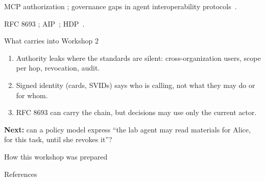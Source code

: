 \documentclass[aspectratio=169, 10pt]{beamer}
\begin{document}
{MCP authorization ; governance gaps in agent interoperability protocols \,\pre. }

{RFC 8693 ; AIP \,\pre; HDP \,\pre. }

\begin{frame}{What carries into Workshop 2}
  \begin{enumerate}
    \item Authority leaks where the standards are silent: cross-organization users, scope per hop, revocation, audit.
    \item Signed identity (cards, SVIDs) says who is calling, not what they may do or for whom.
    \item RFC 8693 can carry the chain, but decisions may use only the current actor.
  \end{enumerate}
  \vspace{2mm}
  \textbf{Next:} can a policy model express ``the lab agent may read materials for Alice, for this task, until she revokes it''?
\end{frame}

\begin{frame}{How this workshop was prepared}
  \centering{}
\end{frame}

\begin{frame}[allowframebreaks]{References}
  \printbibliography[heading=none]
\end{frame}
\end{document}
